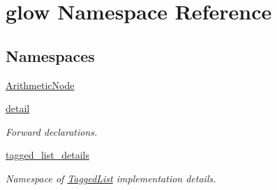\hypertarget{namespaceglow}{}\section{glow Namespace Reference}
\label{namespaceglow}
\subsection*{Namespaces}
\begin{DoxyCompactItemize}
\item 
 \hyperlink{namespaceglow_1_1_arithmetic_node}{Arithmetic\+Node}
\item 
 \hyperlink{namespaceglow_1_1detail}{detail}
\begin{DoxyCompactList}\small\item\em Forward declarations. \end{DoxyCompactList}\item 
 \hyperlink{namespaceglow_1_1tagged__list__details}{tagged\+\_\+list\+\_\+details}
\begin{DoxyCompactList}\small\item\em Namespace of \hyperlink{classglow_1_1_tagged_list}{Tagged\+List} implementation details. \end{DoxyCompactList}\end{DoxyCompactItemize}
